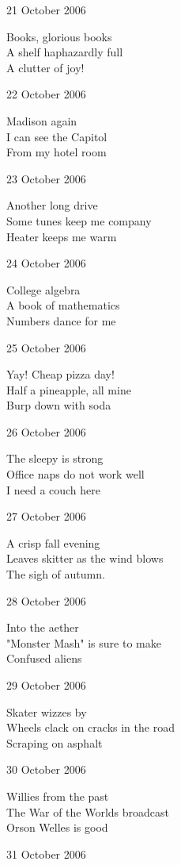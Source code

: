 \documentclass[12pt]{article}
\begin{document}
21 October 2006

Books, glorious books \\
A shelf haphazardly full \\
A clutter of joy!

22 October 2006

Madison again \\
I can see the Capitol \\
From my hotel room

23 October 2006

Another long drive \\
Some tunes keep me company \\
Heater keeps me warm

24 October 2006

College algebra \\
A book of mathematics  \\
Numbers dance for me

25 October 2006

Yay! Cheap pizza day! \\
Half a pineapple, all mine \\
Burp down with soda


\newpage

      
26 October 2006

The sleepy is strong \\
Office naps do not work well \\
I need a couch here

27 October 2006

A crisp fall evening \\
Leaves skitter as the wind blows \\
The sigh of autumn. 

28 October 2006
 
Into the aether \\
"Monster Mash" is sure to make \\
Confused aliens 

29 October 2006

Skater wizzes by \\
Wheels clack on cracks in the road \\
Scraping on asphalt

30 October 2006

Willies from the past \\
The War of the Worlds broadcast \\
Orson Welles is good

31 October 2006
\end{document}
